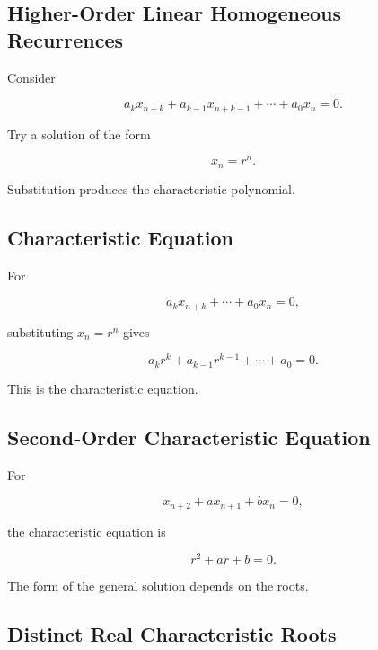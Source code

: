 \subsection{Higher-Order Linear Homogeneous Recurrences}
\label{subsec:higher-order-linear-homogeneous-recurrences}

Consider

\[
\boxed{
a_kx_{n+k}
+
a_{k-1}x_{n+k-1}
+
\cdots
+
a_0x_n
=
0.
}
\]

Try a solution of the form

\[
\boxed{
x_n=r^n.
}
\]

Substitution produces the characteristic polynomial.

\subsection{Characteristic Equation}
\label{subsec:difference-characteristic-equation}

For

\[
a_kx_{n+k}
+
\cdots
+
a_0x_n
=
0,
\]

substituting \(x_n=r^n\) gives

\[
\boxed{
a_kr^k
+
a_{k-1}r^{k-1}
+
\cdots
+
a_0
=
0.
}
\]

This is the characteristic equation.

\subsection{Second-Order Characteristic Equation}
\label{subsec:second-order-difference-characteristic}

For

\[
\boxed{
x_{n+2}
+
ax_{n+1}
+
bx_n
=
0,
}
\]

the characteristic equation is

\[
\boxed{
r^2+ar+b=0.
}
\]

The form of the general solution depends on the roots.

\subsection{Distinct Real Characteristic Roots}
\label{subsec:difference-distinct-real-roots}

